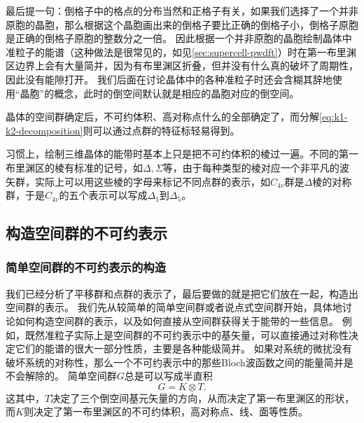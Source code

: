 最后提一句：倒格子中的格点的分布当然和正格子有关，如果我们选择了一个并非原胞的晶胞，那么根据这个晶胞画出来的倒格子要比正确的倒格子小，倒格子原胞是正确的倒格子原胞的整数分之一倍。
因此根据一个并非原胞的晶胞绘制晶体中准粒子的能谱（这种做法是很常见的，如见\autoref{sec:supercell-pwdft}）时在第一布里渊区边界上会有大量简并，因为有布里渊区折叠，但并没有什么真的破坏了周期性，因此没有能隙打开。
我们后面在讨论晶体中的各种准粒子时还会含糊其辞地使用“晶胞”的概念，此时的倒空间默认就是相应的晶胞对应的倒空间。

晶体的空间群确定后，不可约体积、高对称点什么的全部确定了，而分解\eqref{eq:k1-k2-decomposition}则可以通过点群的特征标轻易得到。

习惯上，绘制三维晶体的能带时基本上只是把不可约体积的棱过一遍。不同的第一布里渊区的棱有标准的记号，如$\Delta, \Sigma$等，由于每种类型的棱对应一个非平凡的波矢群，实际上可以用这些棱的字母来标记不同点群的表示，如$C_{4v}$群是$\Delta$棱的对称群，于是$C_{4v}$的五个表示可以写成$\Delta_{1}$到$\Delta_5$。

\subsection{构造空间群的不可约表示}

\subsubsection{简单空间群的不可约表示的构造}

我们已经分析了平移群和点群的表示了，最后要做的就是把它们放在一起，构造出空间群的表示。
我们先从较简单的简单空间群或者说点式空间群开始，具体地讨论如何构造空间群的表示，以及如何直接从空间群获得关于能带的一些信息。
例如，既然准粒子实际上是空间群的不可约表示中的基矢量，可以直接通过对称性决定它们的能谱的很大一部分性质，主要是各种能级简并。
如果对系统的微扰没有破坏系统的对称性，那么一个不可约表示中的那些Bloch波函数之间的能量简并是不会解除的。
简单空间群$G$总是可以写成半直积
\begin{equation}
    G = K \otimes T.
    \label{eq:simple-space-group-structure}
\end{equation}
这其中，$T$决定了三个倒空间基元矢量的方向，从而决定了第一布里渊区的形状，而$K$则决定了第一布里渊区的不可约体积，高对称点、线、面等性质。

